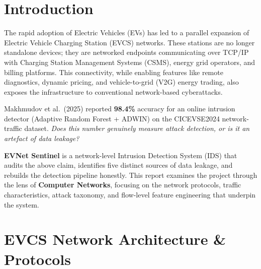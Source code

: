 \documentclass[11pt, a4paper]{article}
\begin{document}
\tableofcontents
\thispagestyle{empty}
\newpage
\setcounter{page}{1}

\section{Introduction}

The rapid adoption of Electric Vehicles (EVs) has led to a parallel expansion of Electric Vehicle Charging Station (EVCS) networks. These stations are no longer standalone devices; they are networked endpoints communicating over TCP/IP with Charging Station Management Systems (CSMS), energy grid operators, and billing platforms. This connectivity, while enabling features like remote diagnostics, dynamic pricing, and vehicle-to-grid (V2G) energy trading, also exposes the infrastructure to conventional network-based cyberattacks.

\begin{highlightbox}[title={\textbf{Core Research Question}}]
    Makhmudov et al.\ (2025) reported \textbf{98.4\%} accuracy for an online intrusion detector (Adaptive Random Forest + ADWIN) on the CICEVSE2024 network-traffic dataset. \textit{Does this number genuinely measure attack detection, or is it an artefact of data leakage?}
\end{highlightbox}

\noindent
\textbf{EVNet Sentinel} is a network-level Intrusion Detection System (IDS) that audits the above claim, identifies five distinct sources of data leakage, and rebuilds the detection pipeline honestly. This report examines the project through the lens of \textbf{Computer Networks}, focusing on the network protocols, traffic characteristics, attack taxonomy, and flow-level feature engineering that underpin the system.

\section{EVCS Network Architecture \& Protocols}
\end{document}
